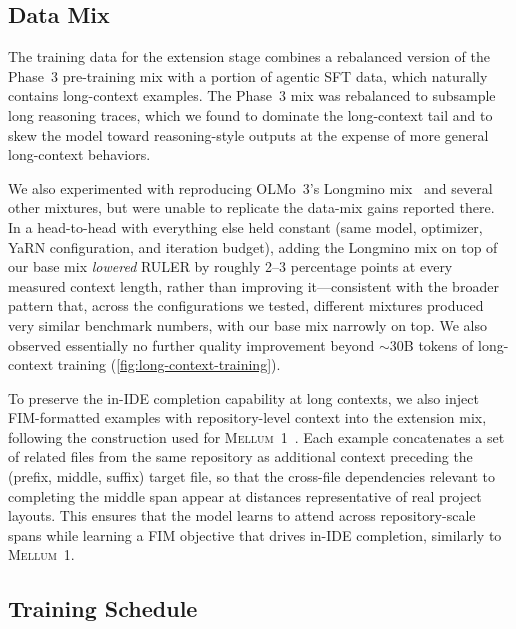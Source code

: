 \documentclass[11pt,a4paper]{article}
\newcommand{\prevmodelname}{\textsc{Mellum}\xspace}
\begin{document}
\subsection{Data Mix}

The training data for the extension stage combines a rebalanced version
of the Phase~3 pre-training mix with a portion of agentic SFT data,
which naturally contains long-context examples. The Phase~3 mix was
rebalanced to subsample long reasoning traces, which we found to
dominate the long-context tail and to skew the model toward
reasoning-style outputs at the expense of more general long-context
behaviors.

We also experimented with reproducing OLMo~3's Longmino mix~\cite{olmo3} and several
other mixtures, but were unable to replicate the data-mix gains reported
there. In a head-to-head with everything else held constant (same model,
optimizer, YaRN configuration, and iteration budget), adding the
Longmino mix on top of our base mix \emph{lowered} RULER by roughly
2--3 percentage points at every measured context length, rather than
improving it---consistent with the broader pattern that, across the
configurations we tested, different mixtures produced very similar
benchmark numbers, with our base mix narrowly on top. We also observed
essentially no further quality improvement beyond ${\sim}$30B tokens of
long-context training (\cref{fig:long-context-training}).

To preserve the in-IDE completion capability at long contexts, we also
inject FIM-formatted examples with repository-level context into the
extension mix, following the construction used for \prevmodelname~1~\cite{mellum2025}.
Each example concatenates a set of related files from the same repository
as additional context preceding the (prefix, middle, suffix) target file,
so that the cross-file dependencies relevant to completing the middle span
appear at distances representative of real project layouts. This ensures
that the model learns to attend across repository-scale spans while learning a FIM objective that drives in-IDE completion, similarly to \prevmodelname~1.

\subsection{Training Schedule}
\end{document}
